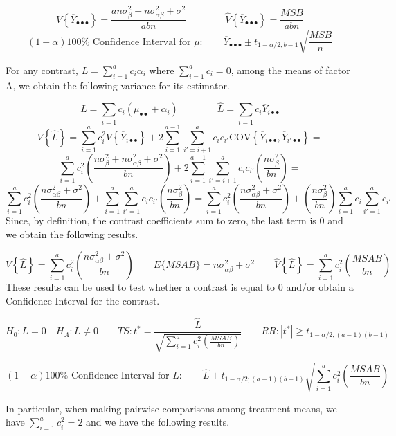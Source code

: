 \documentclass[
]{book}
\begin{document}
\[
V\left\{\overline{Y}_{\bullet\bullet\bullet}\right\}=
\frac{an\sigma_{\beta}^2 + n\sigma_{\alpha\beta}^2 + \sigma^2}{abn} \qquad \qquad
\hat{V}\left\{\overline{Y}_{\bullet\bullet\bullet}\right\}=\frac{MSB}{abn}
\] \[
(1-\alpha)100\% \mbox{ Confidence Interval for } \mu: \qquad
\overline{Y}_{\bullet\bullet\bullet} \pm t_{1-\alpha/2;b-1}
\sqrt{\frac{MSB}{n}}
\]

For any contrast, \(L=\sum_{i=1}^ac_i\alpha_i\) where
\(\sum_{i=1}^ac_i=0\), among the means of factor A, we obtain the
following variance for its estimator.

\[
L=\sum_{i=1}c_i\left(\mu_{\bullet\bullet}+\alpha_i\right) \qquad \qquad 
\hat{L}=\sum_{i=1}c_i\overline{Y}_{i\bullet\bullet}
\] \[
V\left\{\hat{L} \right\}=
\sum_{i=1}^ac_i^2V\left\{\overline{Y}_{i\bullet\bullet}\right\} + 
2\sum_{i=1}^{a-1}\sum_{i'=i+1}^ac_ic_{i'}
\mbox{COV}\left\{\overline{Y}_{i\bullet\bullet},\overline{Y}_{i'\bullet\bullet}\right\}=
\] \[
\sum_{i=1}^ac_i^2\left(\frac{n\sigma_{\beta}^2 + n\sigma_{\alpha\beta}^2 + \sigma^2}{bn}\right) + 
2\sum_{i=1}^{a-1}\sum_{i'=i+1}^ac_ic_{i'}\left(\frac{n\sigma_{\beta}^2}{bn}\right) = 
\] \[
\sum_{i=1}^ac_i^2\left(\frac{n\sigma_{\alpha\beta}^2 + \sigma^2}{bn}\right)  +
\sum_{i=1}^a\sum_{i'=1}^ac_ic_{i'}\left(\frac{n\sigma_{\beta}^2}{bn}\right) = 
\sum_{i=1}^ac_i^2\left(\frac{n\sigma_{\alpha\beta}^2 + \sigma^2}{bn}\right) +
\left(\frac{n\sigma_{\beta}^2}{bn}\right)\sum_{i=1}^ac_i\sum_{i'=1}^ac_{i'}
\] Since, by definition, the contrast coefficients sum to zero, the last
term is 0 and we obtain the following results.

\[
V\left\{\hat{L} \right\}=\sum_{i=1}^ac_i^2\left(\frac{n\sigma_{\alpha\beta}^2 + \sigma^2}{bn}\right)   \qquad  E\{MSAB\} = n\sigma_{\alpha\beta}^2 + \sigma^2  \qquad
\hat{V}\left\{\hat{L} \right\}=\sum_{i=1}^ac_i^2\left(\frac{MSAB}{bn}\right)
\] These results can be used to test whether a contrast is equal to 0
and/or obtain a Confidence Interval for the contrast.

\[
H_0: L=0 \quad H_A: L \neq 0 \qquad  
TS: t^*=\frac{\hat{L}}{\sqrt{\sum_{i=1}^ac_i^2\left(\frac{MSAB}{bn}\right)}}
\qquad RR:|t^*| \geq t_{1-\alpha/2;(a-1)(b-1)}
\]

\[
(1-\alpha)100\% \mbox{ Confidence Interval for } L: \qquad
\hat{L} \pm t_{1-\alpha/2;(a-1)(b-1)} 
\sqrt{\sum_{i=1}^ac_i^2\left(\frac{MSAB}{bn}\right)}
\]

In particular, when making pairwise comparisons among treatment means,
we have \(\sum_{i=1}^ac_i^2=2\) and we have the following results.
\end{document}
